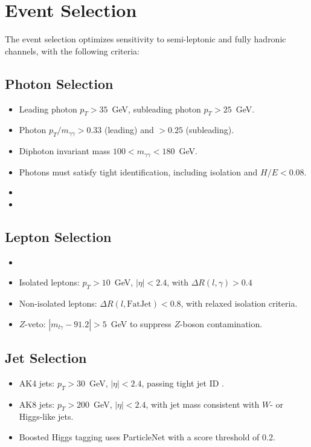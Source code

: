 \section{Event Selection}
The event selection optimizes sensitivity to semi-leptonic and fully hadronic channels, with the following criteria:

\subsection*{Photon Selection}
\begin{itemize}
    \item Leading photon \(p_T > 35\)~GeV, subleading photon \(p_T > 25\)~GeV.
    \item Photon \(p_T/m_{\gamma\gamma} > 0.33\) (leading) and \(> 0.25\) (subleading).
    \item Diphoton invariant mass \(100 < m_{\gamma\gamma} < 180\)~GeV.
    \item Photons must satisfy tight identification, including isolation and \(H/E < 0.08\).
    \item {}
    \item {}
\end{itemize}

\subsection*{Lepton Selection}
\begin{itemize}
    \item {}
    \item Isolated leptons: \(p_T > 10\)~GeV, \(|\eta| < 2.4\), with \(\Delta R(l,\gamma) > 0.4\)
    \item Non-isolated leptons: \(\Delta R(l, \text{FatJet}) < 0.8\), with relaxed isolation criteria.
    \item \(Z\)-veto: \(|m_{l\gamma} - 91.2| > 5\)~GeV to suppress \(Z\)-boson contamination.
\end{itemize}

\subsection*{Jet Selection}
\begin{itemize}
    \item AK4 jets: \(p_T > 30\)~GeV, \(|\eta| < 2.4\), passing tight jet ID .
    \item AK8 jets: \(p_T > 200\)~GeV, \(|\eta| < 2.4\), with jet mass consistent with \(W\)- or Higgs-like jets.
    \item Boosted Higgs tagging uses ParticleNet  with a score threshold of 0.2.
\end{itemize}

